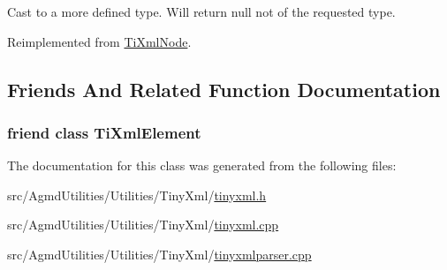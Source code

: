 Cast to a more defined type. Will return null not of the requested type. 



Reimplemented from \hyperlink{class_ti_xml_node_a3ddfbcac78fbea041fad57e5c6d60a03}{Ti\+Xml\+Node}.



\subsection{Friends And Related Function Documentation}
\hypertarget{class_ti_xml_text_ab6592e32cb9132be517cc12a70564c4b}{
\subsubsection[{Ti\+Xml\+Element}]{\setlength{\rightskip}{0pt plus 5cm}friend class {\bf Ti\+Xml\+Element}\hspace{0.3cm}{\ttfamily [friend]}}}\label{class_ti_xml_text_ab6592e32cb9132be517cc12a70564c4b}


The documentation for this class was generated from the following files\+:\begin{DoxyCompactItemize}
\item 
src/\+Agmd\+Utilities/\+Utilities/\+Tiny\+Xml/\hyperlink{tinyxml_8h}{tinyxml.\+h}\item 
src/\+Agmd\+Utilities/\+Utilities/\+Tiny\+Xml/\hyperlink{tinyxml_8cpp}{tinyxml.\+cpp}\item 
src/\+Agmd\+Utilities/\+Utilities/\+Tiny\+Xml/\hyperlink{tinyxmlparser_8cpp}{tinyxmlparser.\+cpp}\end{DoxyCompactItemize}
